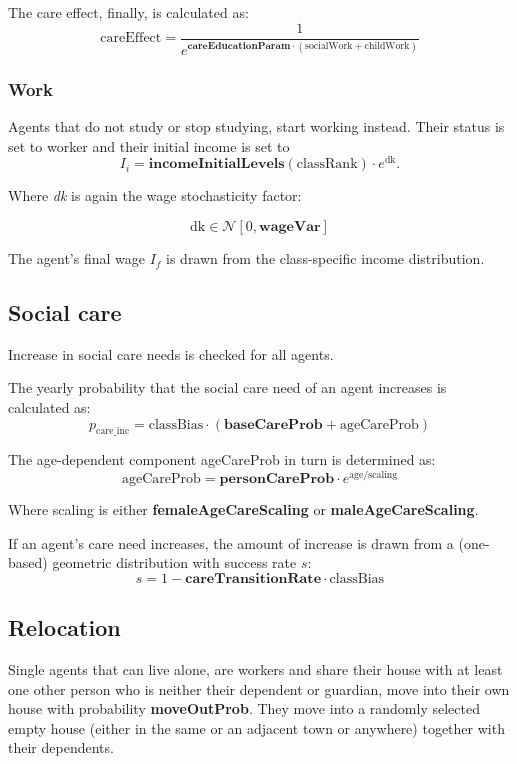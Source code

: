 \documentclass{article}
\begin{document}
The care effect, finally, is calculated as:
\[
\mathrm{careEffect} = \frac{1}{e^{\mathbf{careEducationParam}\cdot(\mathrm{socialWork}+\mathrm{childWork})}}
\]

\subsubsection*{Work}

Agents that do not study or stop studying, start working instead. Their status is set to worker and their initial income is set to
\[
I_i=\mathbf{incomeInitialLevels}(\mathrm{classRank})\cdot e^\mathrm{dk}.
\]

Where \textit{dk} is again the wage stochasticity factor:

\[
\mathrm{dk} \in \mathcal{N}[0, \mathbf{wageVar}]
\]

The agent's final wage $I_f$ is drawn from the class-specific income distribution.

\subsection{Social care}

Increase in social care needs is checked for all agents.

The yearly probability that the social care need of an agent increases is calculated as:
\[
p_\mathrm{care\_inc} = \mathrm{classBias} \cdot (\mathbf{baseCareProb} + \mathrm{ageCareProb})
\]

The age-dependent component ageCareProb in turn is determined as:
\[
\mathrm{ageCareProb} = \mathbf{personCareProb} \cdot e^{\mathrm{age}/\mathrm{scaling}}
\]

Where scaling is either \textbf{femaleAgeCareScaling} or \textbf{maleAgeCareScaling}.

If an agent's care need increases, the amount of increase is drawn from a (one-based) geometric distribution with success rate $s$:
\[
s = 1-\mathbf{careTransitionRate} \cdot \mathrm{classBias}
\]


\subsection{Relocation}

Single agents that can live alone, are workers and share their house with at least one other person who is neither their dependent or guardian, move into their own house with probability \textbf{moveOutProb}. They move into a randomly selected empty house (either in the same or an adjacent town or anywhere) together with their dependents.
\end{document}

